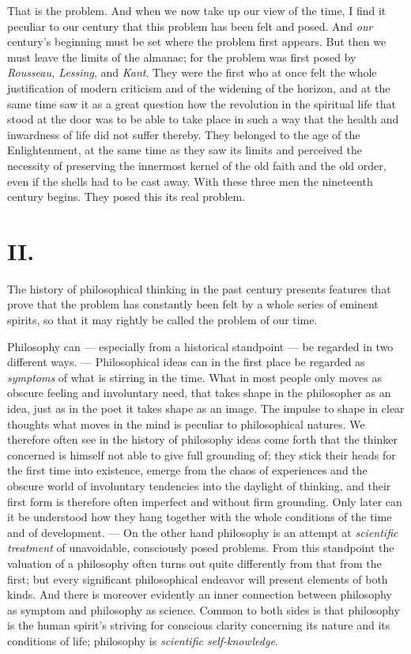 \documentclass[12pt,a4paper,openany]{book}
\newcommand{\opage}[1]{\marginnote{\footnotesize\textit{[#1]}}}
\begin{document}
That is the problem. And when we now take up our
view of the time, I find it peculiar to our century
that this problem has been felt and posed. And \emph{our}
century's beginning must be set where the problem first
appears. But then we must leave the limits of the almanac; for
\opage{231}the problem was first posed by \emph{Rousseau, Lessing}, and \emph{Kant}. They
were the first who at once felt the whole justification of
modern criticism and of the widening of the horizon, and at the same time
saw it as a great question how the revolution in
the spiritual life that stood at the door was to be able to take place
in such a way that the health and inwardness of life did not suffer thereby.
They belonged to the age of the Enlightenment, at the same time as they saw its
limits and perceived the necessity of preserving the innermost
kernel of the old faith and the old order, even if
the shells had to be cast away. With these three men the nineteenth
century begins. They posed this its real
problem.

\section*{II.}

The history of philosophical thinking in the past
century presents features that prove that the problem has constantly
been felt by a whole series of eminent spirits, so
that it may rightly be called the problem of our time.

Philosophy can --- especially from a historical standpoint ---
be regarded in two different ways. --- Philosophical ideas
can in the first place be regarded as \emph{symptoms} of what
is stirring in the time. What in most people only moves
as obscure feeling and involuntary need, that takes shape
in the philosopher as an idea, just as in the poet it takes
shape as an image. The impulse to shape in clear thoughts what
moves in the mind is peculiar to philosophical
natures. We therefore often see in the history of philosophy ideas come
forth that the thinker concerned is himself not able to give
full grounding of; they stick their heads for the first time
into existence, emerge from the chaos of experiences and the
obscure world of involuntary tendencies into the daylight of thinking, and
their first form is therefore often imperfect and without firm
grounding. Only later can it be understood how they
hang together with the whole conditions of the time and of development. ---
On the other hand philosophy is an attempt at \emph{scientific
treatment} of unavoidable, consciously posed problems. From
this standpoint the valuation of a philosophy often turns out quite
\opage{232}differently from that from the first; but every
significant philosophical endeavor will present elements of both
kinds. And there is moreover evidently an inner connection
between philosophy as symptom and philosophy as
science. Common to both sides is that philosophy is the
human spirit's striving for conscious clarity concerning
its nature and its conditions of life; philosophy is \emph{scientific
self-knowledge}.
\end{document}
